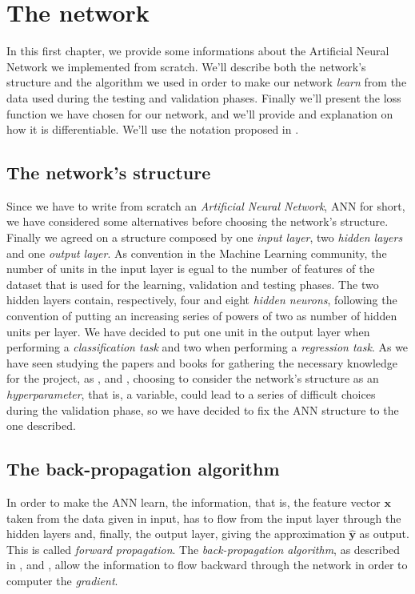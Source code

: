 \chapter{The network} %
\label{cha:the_network}
	\noindent
	In this first chapter, we provide some informations about the Artificial Neural Network we implemented from
	scratch. We'll describe both the network's structure and the algorithm we used in order to make our network
	\textit{learn} from the data used during the testing and validation phases. Finally we'll present the loss
	function we have chosen for our network, and we'll provide and explanation on how it is differentiable. We'll
	use the notation proposed in \cite{Goodfellow-et-al-2016}.

	\section{The network's structure} %
	\label{sec:the_network_s_structure}
		\noindent
		Since we have to write from scratch an \textit{Artificial Neural Network}, ANN for short, we have
		considered some alternatives before choosing the network's structure. Finally we agreed on a structure
		composed by one \textit{input layer}, two \textit{hidden layers} and one \textit{output layer}. As
		convention in the Machine Learning community, the number of units in the input layer is egual to the number
		of features of the dataset that is used for the learning, validation and testing phases. The two
		hidden layers contain, respectively, four and eight \textit{hidden neurons}, following the convention of
		putting an increasing series of powers of two as number of hidden units per layer. We have decided to put
		one unit in the output layer when performing a \textit{classification task} and two when performing a
		\textit{regression task}. As we have seen studying the papers and books for gathering the necessary
		knowledge for the project, as \cite{Goodfellow-et-al-2016}, \cite{haykin2009neural} and
		\cite{mitchell1997machine}, choosing to consider the network's structure as an \textit{hyperparameter},
		that is, a variable, could lead to a series of difficult choices during the validation phase, so we have
		decided to fix the ANN structure to the one described.

	\section{The back-propagation algorithm} %
	\label{sec:the_back-propagation_algorithm}
		\noindent
		In order to make the ANN learn, the information, that is, the feature vector $\mathcal{\mathbf{x}}$ taken
		from the data given in input, has to flow from the input layer through the hidden layers and, finally, the
		output layer, giving the approximation $\hat{\mathbf{y}}$ as output. This is called \textit{forward
		propagation}. The \textit{back-propagation algorithm}, as described in \cite{Goodfellow-et-al-2016},
		\cite{haykin2009neural} and \cite{mitchell1997machine}, allow the information to flow backward through the
		network in order to computer the \textit{gradient}.

